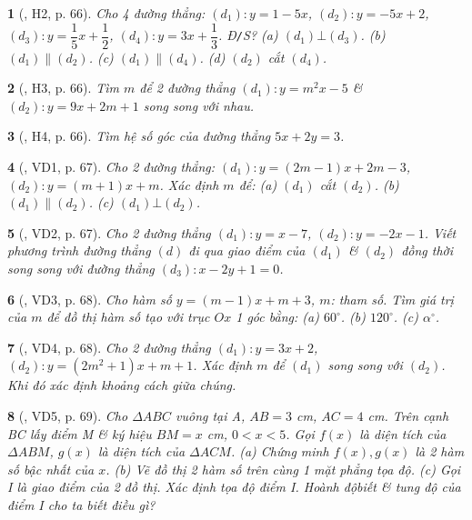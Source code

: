\documentclass{article}
\newtheorem{baitoan}{}
\begin{document}
\begin{baitoan}[\cite{Binh_boi_duong_Toan_9_tap_1}, H2, p. 66]
	Cho 4 đường thẳng: $ (d_1):y = 1 - 5x$, $ (d_2):y = -5x + 2$, $(d_3): y = \dfrac{1}{5}x + \dfrac{1}{2}$, $(d_4):y = 3x + \dfrac{1}{3}$. {\rm Đ{\tt/}S?} (a) $(d_1)\bot(d_3)$. (b) $(d_1)\parallel(d_2)$. (c) $(d_1)\parallel(d_4)$. (d) $(d_2)$ cắt $(d_4)$.
\end{baitoan}

\begin{baitoan}[\cite{Binh_boi_duong_Toan_9_tap_1}, H3, p. 66]
	Tìm $m$ để 2 đường thẳng $(d_1):y = m^2x - 5$ \& $(d_2):y = 9x + 2m + 1$ song song với nhau.
\end{baitoan}

\begin{baitoan}[\cite{Binh_boi_duong_Toan_9_tap_1}, H4, p. 66]
	Tìm hệ số góc của đường thẳng $5x + 2y = 3$.
\end{baitoan}

\begin{baitoan}[\cite{Binh_boi_duong_Toan_9_tap_1}, VD1, p. 67]
	Cho 2 đường thẳng: $(d_1):y = (2m - 1)x + 2m - 3$, $(d_2):y = (m + 1)x + m$. Xác định $m$ để: (a) $(d_1)$ cắt $(d_2)$. (b) $(d_1)\parallel(d_2)$. (c) $(d_1)\bot(d_2)$.
\end{baitoan}

\begin{baitoan}[\cite{Binh_boi_duong_Toan_9_tap_1}, VD2, p. 67]
	Cho 2 đường thẳng $(d_1):y = x - 7$, $(d_2):y = -2x - 1$. Viết phương trình đường thẳng $(d)$ đi qua giao điểm của $(d_1)$ \& $(d_2)$ đồng thời song song với đường thẳng $(d_3):x - 2y + 1 = 0$.
\end{baitoan}

\begin{baitoan}[\cite{Binh_boi_duong_Toan_9_tap_1}, VD3, p. 68]
	Cho hàm số $y = (m - 1)x + m + 3$, $m$: tham số. Tìm giá trị của $m$ để đồ thị hàm số tạo với trục $Ox$ 1 góc bằng: (a) $60^\circ$. (b) $120^\circ$. (c) $\alpha^\circ$.
\end{baitoan}

\begin{baitoan}[\cite{Binh_boi_duong_Toan_9_tap_1}, VD4, p. 68]
	Cho 2 đường thẳng $(d_1):y = 3x + 2$, $(d_2):y = (2m^2 + 1)x + m + 1$. Xác định $m$ để $(d_1)$ song song với $(d_2)$. Khi đó xác định khoảng cách giữa chúng.
\end{baitoan}

\begin{baitoan}[\cite{Binh_boi_duong_Toan_9_tap_1}, VD5, p. 69]
	Cho $\Delta ABC$ vuông tại A, $AB = 3$ {\rm cm}, $AC = 4$ {\rm cm}. Trên cạnh BC lấy điểm M \& ký hiệu $BM = x$ {\rm cm}, $0 < x < 5$. Gọi $f(x)$ là diện tích của $\Delta ABM$, $g(x)$ là diện tích của $\Delta ACM$. (a) Chứng minh $f(x),g(x)$ là 2 hàm số bậc nhất của $x$. (b) Vẽ đồ thị 2 hàm số trên cùng 1 mặt phẳng tọa độ. (c) Gọi I là giao điểm của 2 đồ thị. Xác định tọa độ điểm I. Hoành độbiết \& tung độ của điểm I cho ta biết điều gì?
\end{baitoan}
\end{document}

